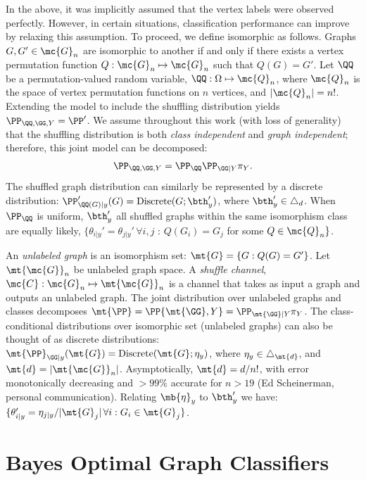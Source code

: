 \documentclass[10pt,journal,cspaper,compsoc]{IEEEtran}
\newcommand{\Qs}{Q}
\begin{document}
In the above, it was implicitly assumed that the vertex labels were observed perfectly.  However, in certain situations, classification performance can improve by relaxing this assumption.  To proceed, we define isomorphic as follows.  Graphs $G,G' \in \mc{G}_n$ are isomorphic to another if and only if there exists a vertex permutation function $\Qs:\mc{G}_n \mapsto \mc{G}_n$ such that $\Qs(G)=G'$.  Let $\QQ$ be a permutation-valued random variable, $\QQ:\Omega \mapsto \mc{Q}_n$, where $\mc{Q}_n$ is the space of vertex permutation functions on $n$ vertices, and $|\mc{Q}_n|=n!$.  Extending the model to include the shuffling distribution yields $\PP_{\QQ,\GG,Y}=\PP'$.  We assume throughout this work (with loss of generality) that the shuffling distribution is both \emph{class independent} and \emph{graph independent}; therefore, this joint model can be decomposed:
\begin{align}
	\PP_{\QQ,\GG,Y} = \PP_{\QQ} \PP_{\GG |Y} \pi_Y.
\end{align}
The shuffled graph distribution can similarly be represented by a discrete distribution: $\PP'_{\QQ(G)|y}(G)=\text{Discrete}(G; \bth_y')$, where $\bth_y' \in \triangle_d$.  When $\PP_{\QQ}$ is uniform, $\bth_y'$  all shuffled graphs within the same isomorphism class are equally likely,  $\{\theta_{i|y}' = \theta_{j|y}' \, \forall i,j$ : $\Qs(G_i)=G_j$ for some $\Qs \in \mc{Q}_n\}$.


An \emph{unlabeled graph} is an isomorphism set: $\mt{G}=\{G: \Qs(G)=G'\}$. Let $\mt{\mc{G}}_n$ be unlabeled graph space. A \emph{shuffle channel}, $\mc{C}: \mc{G}_n \mapsto \mt{\mc{G}}_n$ is a channel that takes as input a graph and outputs an unlabeled graph.  The joint distribution over unlabeled graphs and classes decomposes $\mt{\PP}=\PP{\mt{\GG},Y}=\PP_{\mt{\GG}|Y} \pi_Y$. The class-conditional distributions over isomorphic set (unlabeled graphs) can also be thought of as discrete distributions: $\mt{\PP}_{\GG | y}(\mt{G})=\text{Discrete}(\mt{G}; \eta_y)$, where $\eta_{y}\in \triangle_{\mt{d}}$, and $\mt{d}=|\mt{\mc{G}}_n|$.  Asymptotically, $\mt{d}=d/n!$, with error monotonically decreasing and $>99\%$ accurate for $n>19$ (Ed Scheinerman, personal communication).  Relating $\mb{\eta}_y$ to $\bth_y'$ we have: $\{\theta_{i|y}'=\eta_{j|y}/|\mt{G}_j| \, \forall i : G_i \in \mt{G}_j\}$.  







\section{Bayes Optimal Graph Classifiers} %
\label{sec:bayes_optimal_graph_classifiers}
\end{document}
